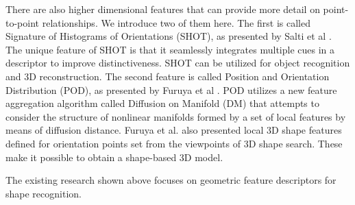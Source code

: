 \begin{deletedblock}
There are also higher dimensional features that can provide more detail on point-to-point relationships. 
We introduce two of them here. 
  The first is called Signature of Histograms of Orientations (SHOT), as presented by Salti et al \cite{SALTI2014251}. 
    The unique feature of SHOT is that it seamlessly integrates multiple cues in a descriptor to improve distinctiveness. 
    SHOT can be utilized for object recognition and 3D reconstruction. 
  The second feature is called Position and Orientation Distribution (POD), as presented by Furuya et al \cite{10.1145/2671188.2749380}.
    POD utilizes a new feature aggregation algorithm called Diffusion on Manifold (DM) that attempts to consider the structure of nonlinear manifolds formed by a set of local features by means of diffusion distance. 
    Furuya et al. also presented local 3D shape features defined for orientation points set from the viewpoints of 3D shape search. 
    These make it possible to obtain a shape-based 3D model. 
\end{deletedblock}

The existing research shown above focuses on geometric feature descriptors for shape recognition.
